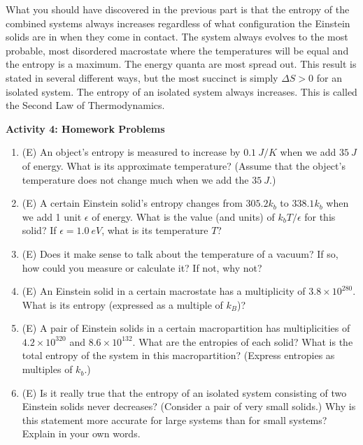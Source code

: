What you should have discovered in the previous part is that the entropy of the combined systems
always increases regardless of what configuration the Einstein solids are in when they
come in contact.
The system always evolves to the most probable, most disordered
 macrostate where the temperatures will
be equal and the entropy is a maximum.
The energy quanta are most spread out.
This result is stated in several different ways, but the most succinct is simply
$\Delta S > 0$ for an isolated system.
The entropy of an isolated system always increases.
This is called the Second Law of Thermodynamics.

\bigskip

\textbf{Activity 4: Homework Problems}

\begin{enumerate}
 
\item (E) An object's entropy is measured to increase by $0.1~ J/K$ 
when we add $35~ J$ of energy.  What is its approximate temperature?  
(Assume that the object's temperature does not change much when we add the $35~J$.)

\item (E) A certain Einstein solid's entropy changes from 
$305.2k_b$ to $338.1k_b$ when we add 1 unit $\epsilon$ of energy.  
What is the value (and units) of $k_bT/\epsilon$ for this solid?  
If $\epsilon = 1.0~eV$, what is its temperature $T$?

\item (E) Does it make sense to talk about the 
temperature of a vacuum?  If so, how could you measure or calculate it?  
If not, why not?  

\item (E) An Einstein solid in a certain macrostate has a multiplicity of $3.8 \times 10^{280}$.  
What is its entropy (expressed as a multiple of $k_B$)?

\item (E) A pair of Einstein solids in a certain macropartition has multiplicities of 
$4.2 \times 10^{320}$ and $8.6 \times 10^{132}$.  What are the entropies of 
each solid?  What is the total 
entropy of the system in this macropartition?  (Express entropies as multiples of $k_b$.)

\item (E) Is it really true that the entropy of an isolated system consisting of two 
Einstein solids never decreases?  (Consider a pair of very small solids.)  Why is this 
statement more accurate for large systems than for small systems?  Explain in your own words.


\end{enumerate}

